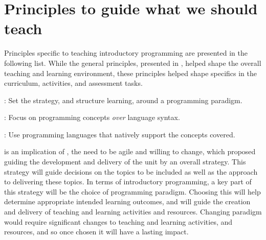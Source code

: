 








\clearpage
\section{Principles to guide what we should teach} %
\label{sec:principles_to_guide_what_we_should_cover}

Principles specific to teaching introductory programming are presented in the following list. While the general principles, presented in , helped shape the overall teaching and learning environment, these principles helped shape specifics in the curriculum, activities, and assessment tasks.

\begin{description}
	\item [\Pref{itm:paradigm}]: Set the strategy, and structure learning, around a programming paradigm.
	\item [\Pref{itm:concepts}]: Focus on programming concepts \emph{over} language syntax.
	\item [\Pref{itm:authentic}]: Use programming languages that natively support the concepts covered.
\end{description}

%

 is an implication of , the need to be agile and willing to change, which proposed guiding the development and delivery of the unit by an overall strategy. This strategy will guide decisions on the topics to be included as well as the approach to delivering these topics. In terms of introductory programming, a key part of this strategy will be the choice of programming paradigm. Choosing this will help determine appropriate intended learning outcomes, and will guide the creation and delivery of teaching and learning activities and resources. Changing paradigm would require significant changes to teaching and learning activities, and resources, and so once chosen it will have a lasting impact.

